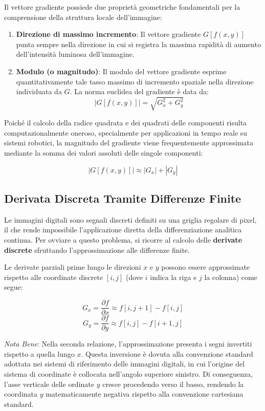 ﻿\documentclass[11pt, a4paper]{article}
\begin{document}
Il vettore gradiente possiede due proprietà geometriche fondamentali per la comprensione della struttura locale dell'immagine:
\begin{enumerate}
    \item \textbf{Direzione di massimo incremento}: Il vettore gradiente $G[f(x,y)]$ punta sempre nella direzione in cui si registra la massima rapidità di aumento dell'intensità luminosa dell'immagine.
    \item \textbf{Modulo (o magnitudo)}: Il modulo del vettore gradiente esprime quantitativamente tale tasso massimo di incremento spaziale nella direzione individuata da $G$. La norma euclidea del gradiente è data da:
    \[ |G[f(x,y)]| = \sqrt{G_x^2 + G_y^2} \]
\end{enumerate}

Poiché il calcolo della radice quadrata e dei quadrati delle componenti risulta computazionalmente oneroso, specialmente per applicazioni in tempo reale su sistemi robotici, la magnitudo del gradiente viene frequentemente approssimata mediante la somma dei valori assoluti delle singole componenti:

\[ \boxed{|G[f(x,y)]| \approx |G_x| + |G_y|} \]

\subsection{Derivata Discreta Tramite Differenze Finite}

Le immagini digitali sono segnali discreti definiti su una griglia regolare di pixel, il che rende impossibile l'applicazione diretta della differenziazione analitica continua. Per ovviare a questo problema, si ricorre al calcolo delle \textbf{derivate discrete} sfruttando l'approssimazione alle differenze finite.

Le derivate parziali prime lungo le direzioni $x$ e $y$ possono essere approssimate rispetto alle coordinate discrete $[i, j]$ (dove $i$ indica la riga e $j$ la colonna) come segue:

\[ G_x = \frac{\partial f}{\partial x} \approx f[i, j+1] - f[i, j] \]
\[ G_y = \frac{\partial f}{\partial y} \approx f[i, j] - f[i+1, j] \]

\emph{Nota Bene}: Nella seconda relazione, l'approssimazione presenta i segni invertiti rispetto a quella lungo $x$. Questa inversione è dovuta alla convenzione standard adottata nei sistemi di riferimento delle immagini digitali, in cui l'origine del sistema di coordinate è collocata nell'angolo superiore sinistro. Di conseguenza, l'asse verticale delle ordinate $y$ cresce procedendo verso il basso, rendendo la coordinata $y$ matematicamente negativa rispetto alla convenzione cartesiana standard.
\end{document}
